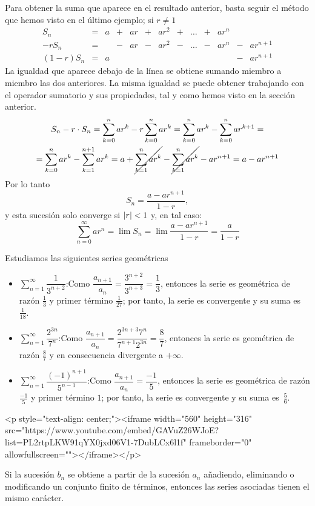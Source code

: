 Para obtener la suma que aparece en el resultado anterior, basta seguir el método que hemos visto en el último ejemplo;  si $r\ne 1$
\[
\begin{array}{rcccccccccccc}
S_n  		& = & a &+& ar &+& ar^2 &+& \dots &+& ar^{n} \\ 
-rS_n 	& = &   &-& ar &-& ar^2 &-& \dots &-& ar^{n} &-& ar^{n+1} \\
\hline
(1-r)S_n& = & a &&&&&&&&&-&ar^{n+1} 
\end{array}
\]
La igualdad que aparece debajo de la línea se obtiene sumando miembro a miembro las dos anteriores.
La misma igualdad se puede obtener trabajando con el operador sumatorio y sus propiedades, tal y como hemos visto en la sección anterior.
%
\begin{multline*}
S_n-r\cdot S_n=
\sum_{k=0}^{n} ar^k - r\sum_{k=0}^{n} ar^k =
\sum_{k=0}^{n} ar^k - \sum_{k=0}^{n} ar^{k+1} =\\
=\sum_{k=0}^{n} ar^k - \sum_{k=1}^{n+1} ar^k =
a+\cancel{\sum_{k=1}^{n} ar^k} - \cancel{\sum_{k=1}^n ar^k} -ar^{n+1}=
a - ar^{n+1}
\end{multline*}
%
Por lo tanto
\[
S_n=\dfrac{a-ar^{n+1}}{1-r},
\]
y esta sucesión solo converge si $|r|< 1$ y, en tal caso:
\[
\displaystyle\sum_{n=0}^\infty   ar^n= \lim S_n=\lim \dfrac{a-ar^{n+1}}{1-r} = \dfrac{a}{1-r}
\]
%
\begin{ejemplo} Estudiamos las siguientes series geométricas
\begin{itemize}
\item
$\displaystyle\sum_{n=1}^\infty   \dfrac{1}{3^{n+2}}$:\qquad Como $\dfrac{a_{n+1}}{a_n}=\dfrac{3^{n+2}}{3^{n+3}}=\dfrac13$, entonces la serie es
geométrica de razón $\frac{1}{3}$ y primer término $\frac{1}{27}$; por tanto, la serie es
convergente y su suma es $\frac{1}{18}$.
\item
$\displaystyle\sum_{n=1}^\infty   \dfrac{2^{3n}}{7^n}$:\qquad Como $\dfrac{a_{n+1}}{a_n}=\dfrac{2^{3n+3}7^n}{7^{n+1}2^{3n}}=\dfrac{8}{7}$, entonces la serie es geométrica de razón $\frac{8}{7}$ y en consecuencia divergente a $+\infty$.
\item
$\displaystyle\sum_{n=1}^\infty   \dfrac{(-1)^{n+1}}{5^{n-1}}$:\qquad Como $\dfrac{a_{n+1}}{a_n}=\dfrac{-1}{5}$, entonces la serie
es geométrica de razón $\frac{-1}{5}$ y primer término $1$; por tanto, la serie es
convergente y su suma es~$\frac{5}{6}$.\newline\fej
\end{itemize}
\end{ejemplo}
\begin{rawhtml}
<p style="text-align: center;"><iframe width="560" height="316" src="https://www.youtube.com/embed/GAVuZ26WJoE?list=PL2rtpLKW91qYX0jxd06V1-7DubLCx6l1f" frameborder="0" allowfullscreen=""></iframe></p>
\end{rawhtml}
\begin{proposicion}\label{T-modif} Si la sucesión $b_n$ se obtiene a partir de la sucesión $a_n$ añadiendo, eliminando o modificando
un conjunto finito de términos, entonces las series asociadas tienen el mismo carácter.
\end{proposicion}

